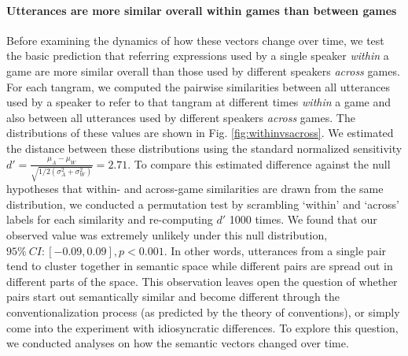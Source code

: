 \documentclass[alpha-refs]{wiley-article}
\begin{document}
\paragraph{Utterances are more similar overall within games than between games}
Before examining the dynamics of how these vectors change over time, we test the basic prediction that referring expressions used by a single speaker \emph{within} a game are more similar overall than those used by different speakers \emph{across} games.
For each tangram, we computed the pairwise similarities between all utterances used by a speaker to refer to that tangram at different times \emph{within} a game and also between all utterances used by different speakers \emph{across} games.
The distributions of these values are shown in Fig. \ref{fig:withinvsacross}.
We estimated the distance between these distributions using the standard normalized sensitivity $d' = \frac{\mu_A - \mu_W}{\sqrt{1/2(\sigma^2_A+\sigma^2_W)}} = 2.71$.
To compare this estimated difference against the null hypotheses that within- and across-game similarities are drawn from the same distribution, we conducted a permutation test by scrambling `within' and `across' labels for each similarity and re-computing $d'$ 1000 times.
We found that our observed value was extremely unlikely under this null distribution, $95\%~CI: [-0.09, 0.09], p < 0.001$.
In other words, utterances from a single pair tend to cluster together in semantic space while different pairs are spread out in different parts of the space.
This observation leaves open the question of whether pairs start out semantically similar and become different through the conventionalization process (as predicted by the theory of conventions), or simply come into the experiment with idiosyncratic differences.
To explore this question, we conducted analyses on how the semantic vectors changed over time.
\end{document}
